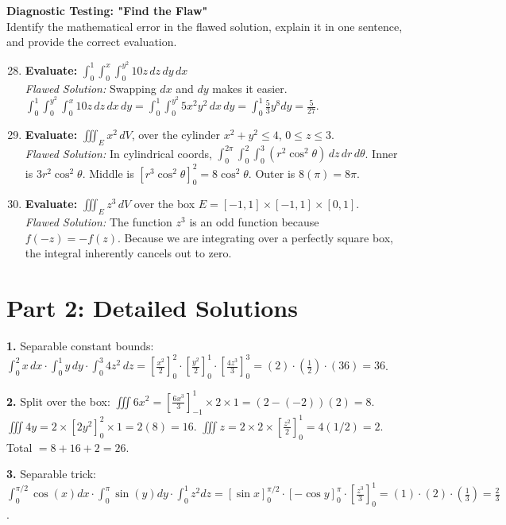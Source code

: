 \documentclass[11pt]{article}
\begin{document}
\textbf{Diagnostic Testing: "Find the Flaw"} \\
Identify the mathematical error in the flawed solution, explain it in one sentence, and provide the correct evaluation.
\begin{enumerate}
\setcounter{enumi}{27}
    \item \textbf{Evaluate:} $\displaystyle \int_0^1 \int_0^x \int_0^{y^2} 10z \,dz\,dy\,dx$ \\
    \textit{Flawed Solution:} Swapping $dx$ and $dy$ makes it easier. $\int_0^1 \int_0^{y^2} \int_0^x 10z \,dz\,dx\,dy = \int_0^1 \int_0^{y^2} 5x^2 y^2 \,dx\,dy = \int_0^1 \frac{5}{3} y^8 dy = \frac{5}{27}$.
    \item \textbf{Evaluate:} $\displaystyle \iiint_E x^2 \,dV$, over the cylinder $x^2+y^2 \le 4$, $0 \le z \le 3$. \\
    \textit{Flawed Solution:} In cylindrical coords, $\int_0^{2\pi} \int_0^2 \int_0^3 (r^2 \cos^2\theta) \,dz\,dr\,d\theta$. Inner is $3r^2\cos^2\theta$. Middle is $[r^3\cos^2\theta]_0^2 = 8\cos^2\theta$. Outer is $8(\pi) = 8\pi$.
    \item \textbf{Evaluate:} $\displaystyle \iiint_E z^3 \,dV$ over the box $E = [-1,1] \times [-1,1] \times [0,1]$. \\
    \textit{Flawed Solution:} The function $z^3$ is an odd function because $f(-z) = -f(z)$. Because we are integrating over a perfectly square box, the integral inherently cancels out to zero.
\end{enumerate}

\newpage
\section*{Part 2: Detailed Solutions}

\textbf{1.} Separable constant bounds: $\int_0^2 x \,dx \cdot \int_0^1 y \,dy \cdot \int_0^3 4z^2 \,dz = [\frac{x^2}{2}]_0^2 \cdot [\frac{y^2}{2}]_0^1 \cdot [\frac{4z^3}{3}]_0^3 = (2) \cdot (\frac{1}{2}) \cdot (36) = 36$.

\textbf{2.} Split over the box: $\iiint 6x^2 = [\frac{6x^3}{3}]_{-1}^1 \times 2 \times 1 = (2 - (-2))(2) = 8$. $\iiint 4y = 2 \times [2y^2]_0^2 \times 1 = 2(8) = 16$. $\iiint z = 2 \times 2 \times [\frac{z^2}{2}]_0^1 = 4(1/2) = 2$. Total $= 8 + 16 + 2 = 26$.

\textbf{3.} Separable trick: $\int_0^{\pi/2} \cos(x) dx \cdot \int_0^\pi \sin(y) dy \cdot \int_0^1 z^2 dz = [\sin x]_0^{\pi/2} \cdot [-\cos y]_0^\pi \cdot [\frac{z^3}{3}]_0^1 = (1) \cdot (2) \cdot (\frac{1}{3}) = \frac{2}{3}$.
\end{document}
